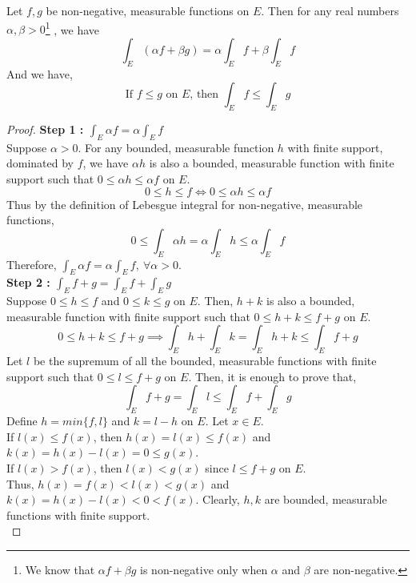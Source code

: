 \begin{theorem}
	Let $f,g$ be non-negative, measurable functions on $E$. Then for any real numbers $\alpha,\beta > 0$\dag\footnote{
		We know that $\alpha f + \beta g$ is non-negative only when $\alpha$ and $\beta$ are non-negative.}
	, we have
	\begin{equation}
		\int_E (\alpha f + \beta g)  = \alpha \int_E f + \beta \int_E f
	\end{equation}
	And we have,
	\begin{equation}
		\text{If } f \le g \text{ on $E$, then } \int_E f \le \int_E g
	\end{equation}
\end{theorem}
\begin{proof}
	\textbf{Step 1 : $\displaystyle \int_E \alpha f = \alpha \int_E f$}\\
	Suppose $\alpha > 0$.
	For any bounded, measurable function $h$ with finite support, dominated by $f$, we have $\alpha h$ is also a bounded, measurable function with finite support such that $0 \le \alpha h \le \alpha f$ on $E$.
	$$0 \le h \le f \iff 0 \le \alpha h \le \alpha f$$
	Thus by the definition of Lebesgue integral for non-negative, measurable functions,
	$$0 \le \int_E \alpha h  = \alpha \int_E h \le \alpha \int_E f $$
	Therefore, $\displaystyle \int_E \alpha f = \alpha \int_E f,\ \forall \alpha > 0$.\\

	\textbf{Step 2 : $\displaystyle \int_E f+g = \int_E f + \int_E g$}\\
	Suppose $0 \le h \le f$ and $0 \le k \le g$ on $E$.
	Then, $h+k$ is also a bounded, measurable function with finite support such that $0 \le h+k \le f+g$ on $E$.
	\begin{equation}
		0 \le h+k \le f+g \implies \int_E h + \int_E k = \int_E h+k \le \int_E f+g 
	\end{equation}
	Let $l$ be the supremum of all the bounded, measurable functions with finite support such that $0 \le l \le f+g$ on $E$.
	Then, it is enough to prove that,
	$$ \int_E f+g = \int_E l \le \int_E f + \int_E g$$
	Define $h = min\{f,l\}$ and $k = l -h$ on $E$.
	Let $x \in E$.\\
	If $l(x) \le f(x)$, then $h(x) = l(x) \le f(x)$ and $k(x) = h(x) - l(x) = 0 \le g(x)$.\\
	If $l(x) > f(x)$, then $l(x) < g(x)$ since $l \le f+g$ on $E$.\\
	Thus, $h(x) = f(x) < l(x) < g(x)$ and $k(x) = h(x) - l(x) < 0 < f(x)$.
	Clearly, $h,k$ are bounded, measurable functions with finite support.\\


\end{proof}
